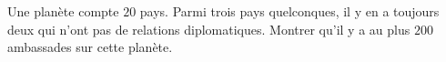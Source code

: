 Une planète compte $20$ pays. Parmi trois pays quelconques, il y en a toujours deux qui n'ont pas de relations diplomatiques. Montrer qu'il y a au plus $200$ ambassades sur cette planète.
